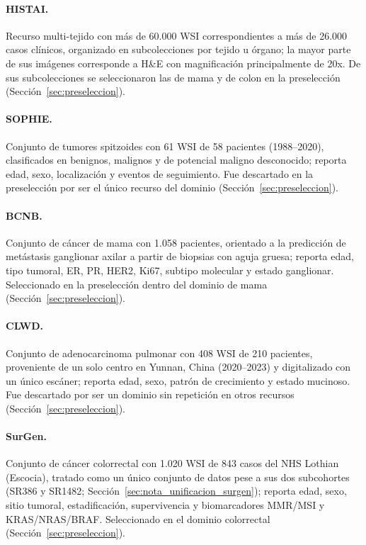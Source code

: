 \paragraph{HISTAI.} Recurso multi-tejido con más de 60.000 WSI correspondientes a más de 26.000 casos clínicos, organizado en subcolecciones por tejido u órgano; la mayor parte de sus imágenes corresponde a H\&E con magnificación principalmente de 20x. De sus subcolecciones se seleccionaron las de mama y de colon en la preselección \parencite{HISTAI2025} (Sección~\ref{sec:preseleccion}).

\paragraph{SOPHIE.} Conjunto de tumores spitzoides con 61 WSI de 58 pacientes (1988--2020), clasificados en benignos, malignos y de potencial maligno desconocido; reporta edad, sexo, localización y eventos de seguimiento. Fue descartado en la preselección por ser el único recurso del dominio \parencite{SOPHIE2023} (Sección~\ref{sec:preseleccion}).

\paragraph{BCNB.} Conjunto de cáncer de mama con 1.058 pacientes, orientado a la predicción de metástasis ganglionar axilar a partir de biopsias con aguja gruesa; reporta edad, tipo tumoral, ER, PR, HER2, Ki67, subtipo molecular y estado ganglionar. Seleccionado en la preselección dentro del dominio de mama \parencite{BCNB2021} (Sección~\ref{sec:preseleccion}).

\paragraph{CLWD.} Conjunto de adenocarcinoma pulmonar con 408 WSI de 210 pacientes, proveniente de un solo centro en Yunnan, China (2020--2023) y digitalizado con un único escáner; reporta edad, sexo, patrón de crecimiento y estado mucinoso. Fue descartado por ser un dominio sin repetición en otros recursos \parencite{CLWD2026} (Sección~\ref{sec:preseleccion}).

\paragraph{SurGen.} Conjunto de cáncer colorrectal con 1.020 WSI de 843 casos del NHS Lothian (Escocia), tratado como un único conjunto de datos pese a sus dos subcohortes (SR386 y SR1482; Sección~\ref{sec:nota_unificacion_surgen}); reporta edad, sexo, sitio tumoral, estadificación, supervivencia y biomarcadores MMR/MSI y KRAS/NRAS/BRAF. Seleccionado en el dominio colorrectal \parencite{SurGen2026} (Sección~\ref{sec:preseleccion}).

